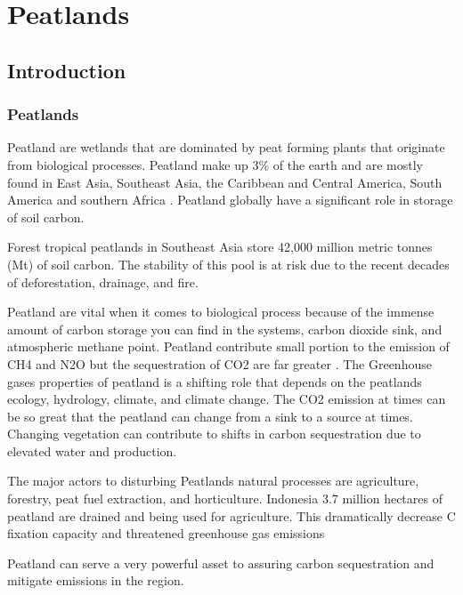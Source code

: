 \chapter{Peatlands}\label{ch:peatlands}

\section{Introduction}

\subsection{Peatlands}

Peatland are wetlands that are dominated by peat forming plants that originate from biological processes. Peatland make up 3\% of the earth and are mostly found in East Asia, Southeast Asia, the Caribbean and Central America, South America and southern Africa \citep{strack2008peatlands}. Peatland globally have a  significant role in storage of soil carbon. 

Forest tropical peatlands in Southeast Asia store 42,000 million metric tonnes (Mt) of soil carbon. The stability of this pool is at risk due to the recent decades of deforestation, drainage, and fire. 

Peatland are vital when it comes to biological process because of the immense amount of carbon storage you can find in the systems, carbon dioxide sink, and atmospheric methane point. Peatland contribute small portion to the emission of CH4  and N2O but the sequestration of CO2 are far greater \citep{strack2008peatlands}. The Greenhouse gases properties of peatland is a shifting role that depends on the peatlands ecology, hydrology, climate, and climate change. The CO2 emission at times can be so great that the peatland can change from a sink to a source at times. Changing vegetation can contribute to shifts in carbon sequestration due to elevated water and production.

The major actors to disturbing Peatlands natural processes  are agriculture, forestry, peat fuel extraction, and horticulture.  Indonesia 3.7 million hectares of peatland are drained and being used for agriculture. This dramatically decrease C fixation capacity and threatened greenhouse gas emissions

Peatland can serve a very powerful asset to assuring carbon sequestration and mitigate emissions in the region.


